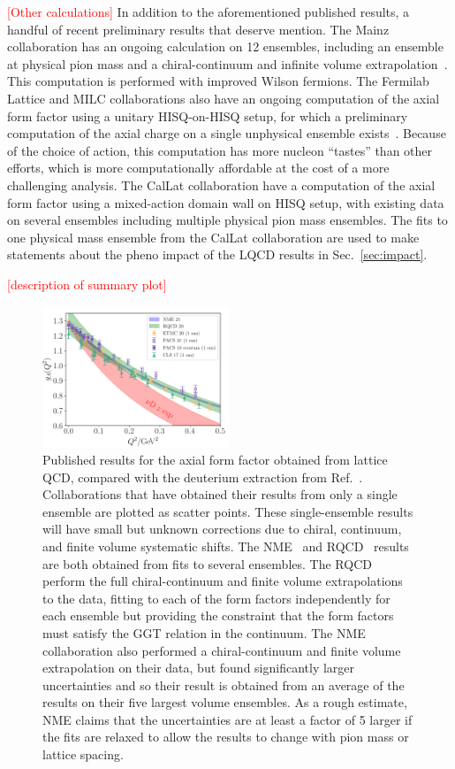 \textcolor{red}{[Other calculations]}
In addition to the aforementioned published results,
 a handful of recent preliminary results that deserve mention.
The Mainz collaboration has an ongoing calculation on 12 ensembles,
 including an ensemble at physical pion mass
 and a chiral-continuum and infinite volume extrapolation~\cite{Djukanovic:2021yqg}.
This computation is performed with improved Wilson fermions.
The Fermilab Lattice and MILC collaborations also have an ongoing
 computation of the axial form factor using a unitary HISQ-on-HISQ setup,
 for which a preliminary computation of the axial charge on
 a single unphysical ensemble exists~\cite{Lin:2020wko}.
Because of the choice of action, this computation has more nucleon ``tastes''
 than other efforts, which is more computationally affordable
 at the cost of a more challenging analysis.
The CalLat collaboration have a computation of the axial form factor
 using a mixed-action domain wall on HISQ setup,
 with existing data on several ensembles including multiple physical pion mass ensembles.
The fits to one physical mass ensemble from the CalLat collaboration are used
 to make statements about the pheno impact of the LQCD results in Sec.~\ref{sec:impact}.

\textcolor{red}{[description of summary plot]}

\begin{figure}[hbt!]
\centering
\includegraphics[width=0.5\textwidth]{plots/gaq2-overlay-standalone.pdf}
\caption{
Published results for the axial form factor obtained from lattice QCD,
 compared with the deuterium extraction from Ref.~\cite{Meyer:2016oeg}.
Collaborations that have obtained their results from only a single ensemble
 are plotted as scatter points.
These single-ensemble results will have small but unknown corrections due to chiral, continuum,
 and finite volume systematic shifts.
The NME~\cite{Park:2021ypf} and RQCD~\cite{RQCD:2019jai}
 results are both obtained from fits to several ensembles.
The RQCD perform the full chiral-continuum and finite volume extrapolations to the data,
 fitting to each of the form factors independently for each ensemble but providing
 the constraint that the form factors must satisfy the GGT relation in the continuum.
The NME collaboration also performed a chiral-continuum and finite volume extrapolation
 on their data, but found significantly larger uncertainties and so their result
 is obtained from an average of the results on their five largest volume ensembles.
As a rough estimate, NME claims that the uncertainties are at least a factor of 5 larger
 if the fits are relaxed to allow the results to change with pion mass or lattice spacing.
}
\end{figure}

